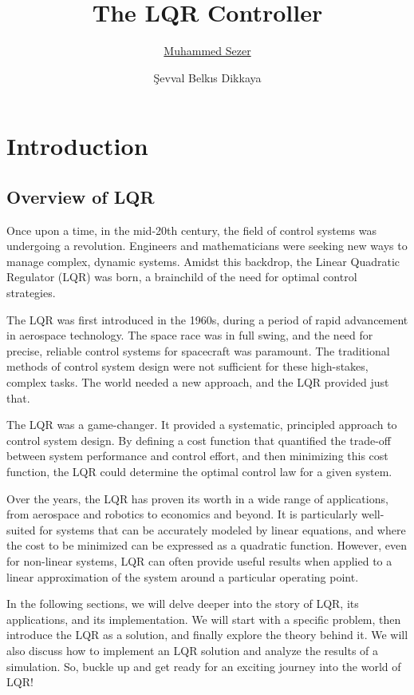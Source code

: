 \documentclass[11pt,twocolumn,twoside,lineno]{pnas-new}
\title{The LQR Controller}
\author[a,b]{\href{https://github.com/sezer-muhammed?tab=repositories}{Muhammed Sezer}}
\author[a,b]{Şevval Belkıs Dikkaya}
\affil[a]{\href{https://www.metu.edu.tr/}{Middle East Technical University}}
\affil[b]{\href{https://www.orionrobotics.org}{Orion Robotics Ltd.}}
\begin{document}
\maketitle
\thispagestyle{firststyle}


\section{Introduction}
\subsection{Overview of LQR}

Once upon a time, in the mid-20th century, the field of control systems was undergoing a revolution. Engineers and mathematicians were seeking new ways to manage complex, dynamic systems. Amidst this backdrop, the Linear Quadratic Regulator (LQR) was born, a brainchild of the need for optimal control strategies.

The LQR was first introduced in the 1960s, during a period of rapid advancement in aerospace technology. The space race was in full swing, and the need for precise, reliable control systems for spacecraft was paramount. The traditional methods of control system design were not sufficient for these high-stakes, complex tasks. The world needed a new approach, and the LQR provided just that.

The LQR was a game-changer. It provided a systematic, principled approach to control system design. By defining a cost function that quantified the trade-off between system performance and control effort, and then minimizing this cost function, the LQR could determine the optimal control law for a given system.

Over the years, the LQR has proven its worth in a wide range of applications, from aerospace and robotics to economics and beyond. It is particularly well-suited for systems that can be accurately modeled by linear equations, and where the cost to be minimized can be expressed as a quadratic function. However, even for non-linear systems, LQR can often provide useful results when applied to a linear approximation of the system around a particular operating point.

In the following sections, we will delve deeper into the story of LQR, its applications, and its implementation. We will start with a specific problem, then introduce the LQR as a solution, and finally explore the theory behind it. We will also discuss how to implement an LQR solution and analyze the results of a simulation. So, buckle up and get ready for an exciting journey into the world of LQR!
\end{document}
